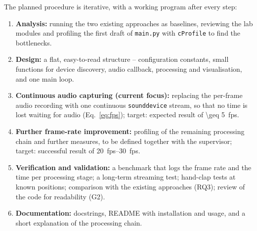 \documentclass[11pt,a4paper]{article}
\newcommand{\code}[1]{\texttt{#1}}
\begin{document}
The planned procedure is iterative, with a working program after every step:
\begin{enumerate}
  \item \textbf{Analysis:} running the two existing approaches as baselines,
        reviewing the lab modules and profiling the first draft of
        \code{main.py} with \code{cProfile} to find the bottlenecks.
  \item \textbf{Design:} a flat, easy-to-read structure -- configuration
        constants, small functions for device discovery, audio callback,
        processing and visualisation, and one main loop.
  \item \textbf{Continuous audio capturing (current focus):} replacing the
        per-frame audio recording with one continuous \code{sounddevice}
        stream, so that no time is lost waiting for audio
        (Eq.~\eqref{eq:fps}); target: expected result of \SI{\geq 5}{fps}.
  \item \textbf{Further frame-rate improvement:} profiling of the remaining
        processing chain and further measures, to be defined together with
        the supervisor; target: successful result of \SIrange{20}{30}{fps}.
  \item \textbf{Verification and validation:} a benchmark that logs the frame
        rate and the time per processing stage; a long-term streaming test;
        hand-clap tests at known positions; comparison with the existing
        approaches (RQ3); review of the code for readability (G2).
  \item \textbf{Documentation:} docstrings, README with installation and
        usage, and a short explanation of the processing chain.
\end{enumerate}

\end{document}
